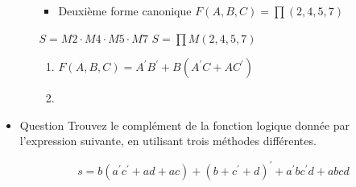 \documentclass[letter, oneside]{book}
\begin{document}
\begin{itemize}
\begin{itemize}
\begin{itemize}
\item Deuxième forme canonique \(F(A,B,C) = \prod (2,4,5,7)\)
\end{itemize}
\(S = M2 \cdot M4 \cdot M5 \cdot M7\)
\(S = \prod M(2, 4, 5, 7)\)

\begin{enumerate}
\item \(F(A,B,C) = A^{\prime} B^{\prime} + B (A^{\prime} C + A C^{\prime})\)

\item \begin{center}

\end{center}
\end{enumerate}
\end{itemize}

\item Question
\label{sec:org259a095}
Trouvez le complément de la fonction logique donnée par l'expression
suivante, en utilisant trois méthodes différentes.

$$s = b (a^{\prime} c^{\prime} + a d + a c) + (b + c^{\prime}+
    d)^{\prime} + a^{\prime} b c^{\prime} d + a b c d$$


\end{itemize}
\end{document}
